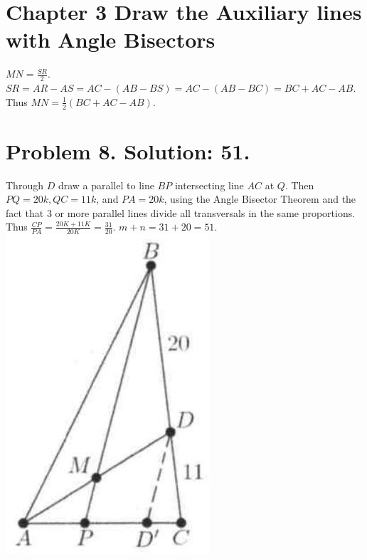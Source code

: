 \documentclass[10pt]{article}
\begin{document}
\section*{Chapter 3 Draw the Auxiliary lines with Angle Bisectors}
\(M N=\frac{S R}{2}\).\\
\(S R=A R-A S=A C-(A B-B S)=A C-(A B-B C)=B C+A C-A B\).\\
Thus \(M N=\frac{1}{2}(B C+A C-A B)\).

\section*{Problem 8. Solution: 51.}
Through \(D\) draw a parallel to line \(B P\) intersecting line \(A C\) at \(Q\). Then \(P Q=20 k, Q C=11 k\), and \(P A=20 k\), using the Angle Bisector Theorem and the fact that 3 or more parallel lines divide all transversals in the same proportions. Thus \(\frac{C P}{P A}=\frac{20 K+11 K}{20 K}=\frac{31}{20}\). \(m+n=31+20=51\).\\
\includegraphics[max width=\textwidth, center]{2025_04_17_97bc1f7e44d93c271a88g-070}
\end{document}
